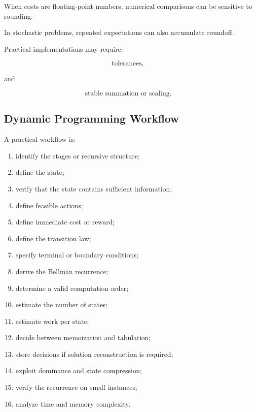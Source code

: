 When costs are floating-point numbers, numerical comparisons can be
sensitive to rounding.

In stochastic problems, repeated expectations can also accumulate
roundoff.

Practical implementations may require:

\[
\boxed{
\text{tolerances},
}
\]

and

\[
\boxed{
\text{stable summation or scaling}.
}
\]

\subsection{Dynamic Programming Workflow}
\label{subsec:dynamic-programming-workflow}

A practical workflow is:

\begin{enumerate}
    \item identify the stages or recursive structure;
    \item define the state;
    \item verify that the state contains sufficient information;
    \item define feasible actions;
    \item define immediate cost or reward;
    \item define the transition law;
    \item specify terminal or boundary conditions;
    \item derive the Bellman recurrence;
    \item determine a valid computation order;
    \item estimate the number of states;
    \item estimate work per state;
    \item decide between memoization and tabulation;
    \item store decisions if solution reconstruction is required;
    \item exploit dominance and state compression;
    \item verify the recurrence on small instances;
    \item analyze time and memory complexity.
\end{enumerate}

